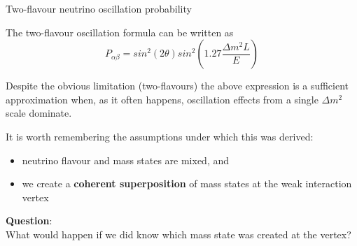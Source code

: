 %
%
%
\begin{frame}{Two-flavour neutrino oscillation probability}

  The two-flavour oscillation formula can be written as
  \begin{equation*}
       P_{\alpha \beta} = sin^{2} (2\theta) sin^2(1.27 \frac{\Delta m^{2}L}{E})
  \end{equation*}

  \vspace{0.3cm}
  Despite the obvious limitation (two-flavours) the above expression is a sufficient approximation
  when, as it often happens, oscillation effects from a single $\Delta m^{2}$ scale dominate.\\

  \vspace{0.2cm}
  \begin{block}{}
  {\scriptsize
    It is worth remembering the assumptions under which this was derived:
    \begin{itemize}
    \item neutrino flavour and mass states are mixed, and
    \item we create a {\bf coherent superposition} of mass states at the weak interaction vertex
    \end{itemize}
    \vspace{0.3cm}
    {\bf Question}: \\
    What would happen if we did know which mass state was created at the vertex?
  }
  \end{block}

\end{frame}


